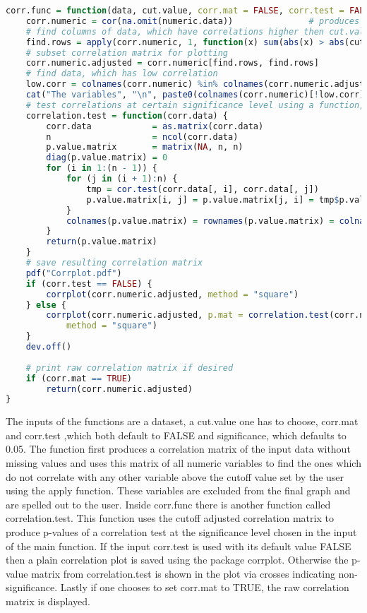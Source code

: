 \begin{lstlisting}[language=R]
corr.func = function(data, cut.value, corr.mat = FALSE, corr.test = FALSE, significance = 0.05) {
    corr.numeric = cor(na.omit(numeric.data))               # produces correlation matrix of all numeric variables in the dataset
    # find columns of data, which have correlations higher then cut.value
    find.rows = apply(corr.numeric, 1, function(x) sum(abs(x) > abs(cut.value)) > 1)
    # subset correlation matrix for plotting
    corr.numeric.adjusted = corr.numeric[find.rows, find.rows]
    # find data, which has low correlation
    low.corr = colnames(corr.numeric) %in% colnames(corr.numeric.adjusted)
    cat("The variables", "\n", paste0(colnames(corr.numeric)[!low.corr], collapse = ", "), "\n", "have very low bivariate correlations with the other numeric variables in the training data set!")
    # test correlations at certain significance level using a function, that produces a p-value matrix for all bivariate correlations
    correlation.test = function(corr.data) {
        corr.data            = as.matrix(corr.data)
        n                    = ncol(corr.data)
        p.value.matrix       = matrix(NA, n, n)
        diag(p.value.matrix) = 0
        for (i in 1:(n - 1)) {
            for (j in (i + 1):n) {
                tmp = cor.test(corr.data[, i], corr.data[, j])            # testing correlation
                p.value.matrix[i, j] = p.value.matrix[j, i] = tmp$p.value # filling p-value matrix with respective p-values
            }
            colnames(p.value.matrix) = rownames(p.value.matrix) = colnames(corr.numeric.adjusted)
        }
        return(p.value.matrix)
    }
    # save resulting correlation matrix
    pdf("Corrplot.pdf")
    if (corr.test == FALSE) {
        corrplot(corr.numeric.adjusted, method = "square")
    } else {
        corrplot(corr.numeric.adjusted, p.mat = correlation.test(corr.numeric.adjusted), sig.level = significance, 
            method = "square")
    }
    dev.off()
    
    # print raw correlation matrix if desired
    if (corr.mat == TRUE) 
        return(corr.numeric.adjusted)
}
\end{lstlisting}
The inputs of the functions are a dataset, a cut.value one has to choose, corr.mat and corr.test ,which both default to FALSE and significance, which defaults to 0.05. The function first produces a correlation matrix of the input data without missing values and uses this matrix of all numeric variables to find the ones which do not correlate with any other variable above the cutoff value set by the user using the apply function. These variables are excluded from the final graph and are spelled out to the user. Inside corr.func there is another function called correlation.test. This function uses the cutoff adjusted correlation matrix to produce p-values of a correlation test at the significance level chosen in the input of the main function. If the input corr.test is used with its default value FALSE then a plain correlation plot is saved using the package corrplot. Otherwise the p-value matrix from correlation.test is shown in the plot via crosses indicating non-significance. Lastly if one chooses to set corr.mat to TRUE, the raw correlation matrix is displayed. \\
